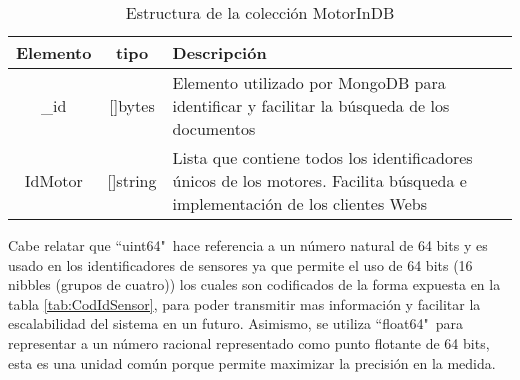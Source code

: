 \vspace{1cm}


    \begin{table}[ht]
        \begin{center}
        \caption[Estructura de MotorInDB]{Estructura de la colección MotorInDB}
        \label{tab:MotorInDBbson}
            \vspace{0.3cm}
            \begin{tabular}{|c|c|p{11cm}|}
                \hline
                Elemento & tipo     & Descripción \\\hline\hline
                \_id      & []bytes  & Elemento utilizado por MongoDB para
                identificar y facilitar la búsqueda de los documentos\\\hline
                IdMotor  & []string & Lista que contiene todos los identificadores
                únicos de los motores. Facilita búsqueda e implementación de los
                clientes Webs\\\hline
            \end{tabular}
        \end{center}
    \end{table}

    Cabe relatar que ``uint64"\  hace referencia a un número natural de 64 bits
    y es usado en los identificadores de sensores ya que permite el uso de 64
    bits (16 nibbles (grupos de cuatro)) los cuales son codificados de
    la forma expuesta en la tabla \ref{tab:CodIdSensor}, para
    poder transmitir mas información y facilitar la escalabilidad del sistema en
    un futuro.
    Asimismo, se utiliza
    ``float64"\ para representar  a un número racional representado como punto
    flotante de 64 bits, esta es una unidad común porque permite maximizar la
    precisión en la medida.


